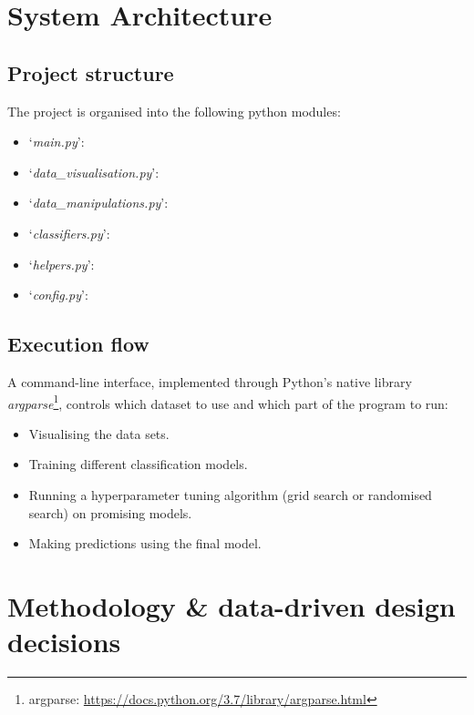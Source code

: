 \documentclass[letterpaper,12pt]{article}
\begin{document}

\section{System Architecture}
\label{sec:system-architecture}

\subsection{Project structure}

The project is organised into the following python modules:
\begin{itemize}
    \item `\textit{main.py}': 
    \item `\textit{data\_visualisation.py}': 
    \item `\textit{data\_manipulations.py}': 
    \item `\textit{classifiers.py}':
    \item `\textit{helpers.py}': 
    \item `\textit{config.py}': 
\end{itemize}

\subsection{Execution flow}

A command-line interface, implemented through Python’s native library \textit{argparse}\footnote{argparse: \url{https://docs.python.org/3.7/library/argparse.html}}, controls which dataset to use and which part of the program to run:
\begin{itemize}
    \item Visualising the data sets.
    \item Training different classification models.
    \item Running a hyperparameter tuning algorithm (grid search or randomised search) on promising models.
    \item Making predictions using the final model.
\end{itemize}


\section{Methodology \& data-driven design decisions}
\label{sec:methodology-design}
\end{document}
